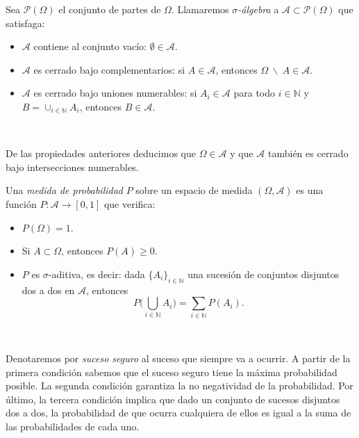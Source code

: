 \documentclass[oneside,openright,titlepage,numbers=noenddot,openany,headinclude,footinclude=true,
cleardoublepage=empty,abstractoff,BCOR=5mm,paper=a4,fontsize=12pt,main=spanish]{scrreprt}
\begin{document}
\begin{definition}
Sea $\mathcal{P}(\Omega)$ el conjunto de partes de $\Omega$. Llamaremos \textit{$\sigma$-álgebra} a $\mathcal{A} \subset \mathcal{P}(\Omega)$ que satisfaga:

\begin{itemize}
\item $\mathcal{A}$ contiene al conjunto vacío: $\emptyset \in \mathcal{A}$.
\item $\mathcal{A}$ es cerrado bajo complementarios: si $A \in \mathcal{A}$, entonces $\Omega\ \backslash\ A \in \mathcal{A}$.
\item $\mathcal{A}$ es cerrado bajo uniones numerables: si $A_i \in \mathcal{A}$ para todo $i \in \mathbb{N}$ y $B=\cup_{i\in \mathbb{N}}A_i$, entonces $B \in \mathcal{A}$.
\end{itemize}
\end{definition}\

De las propiedades anteriores deducimos que $\Omega \in \mathcal{A}$ y que $\mathcal{A}$ también es cerrado bajo intersecciones numerables.\\

\begin{definition} Una \textit{medida de probabilidad} $P$ sobre un espacio de medida $(\Omega, \mathcal{A})$ es una función $P\colon \mathcal{A} \to [0,1]$ que verifica:

\begin{itemize}
    \item $P(\Omega) = 1$.
    \item Si $A \subset \Omega$, entonces $P(A) \geq 0$.
    \item $P$ es $\sigma$-aditiva, es decir: dada $\{A_i\}_{i\in \mathbb{N}}$ una sucesión de conjuntos disjuntos dos a dos en $\mathcal{A}$, entonces
  \[
  P\Big(\bigcup_{i\in \mathbb{N}}A_i \Big) = \sum_{i \in \mathbb{N}}P(A_i).
  \]
\end{itemize}
\end{definition}\

Denotaremos por \textit{suceso seguro} al suceso que siempre va a ocurrir. A partir de la primera condición sabemos que el suceso seguro tiene la máxima probabilidad posible. La segunda condición garantiza la no negatividad de la probabilidad. Por último, la tercera condición implica que dado un conjunto de sucesos disjuntos dos a dos, la probabilidad de que ocurra cualquiera de ellos es igual a la suma de las probabilidades de cada uno.\\
\end{document}

